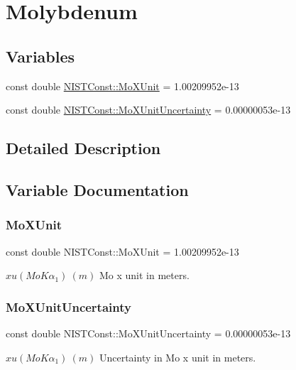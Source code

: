 \hypertarget{group___n_i_s_t_const-_molybdenum}{}\section{Molybdenum}
\label{group___n_i_s_t_const-_molybdenum}
\subsection*{Variables}
\begin{DoxyCompactItemize}
\item 
const double \hyperlink{group___n_i_s_t_const-_molybdenum_ga31f18ed601e6b0e9ebe95a3ac3d962f5}{N\+I\+S\+T\+Const\+::\+Mo\+X\+Unit} = 1.\+00209952e-\/13
\item 
const double \hyperlink{group___n_i_s_t_const-_molybdenum_ga19a2cda46a2fb26d7036c47c53cdd607}{N\+I\+S\+T\+Const\+::\+Mo\+X\+Unit\+Uncertainty} = 0.\+00000053e-\/13
\end{DoxyCompactItemize}


\subsection{Detailed Description}


\subsection{Variable Documentation}
\mbox{\label{group___n_i_s_t_const-_molybdenum_ga31f18ed601e6b0e9ebe95a3ac3d962f5}} 
\subsubsection{\texorpdfstring{Mo\+X\+Unit}{MoXUnit}}
{\footnotesize\ttfamily const double N\+I\+S\+T\+Const\+::\+Mo\+X\+Unit = 1.\+00209952e-\/13}

$xu(MoK\alpha_1) \ (m)$ Mo x unit in meters. \mbox{\label{group___n_i_s_t_const-_molybdenum_ga19a2cda46a2fb26d7036c47c53cdd607}} 
\subsubsection{\texorpdfstring{Mo\+X\+Unit\+Uncertainty}{MoXUnitUncertainty}}
{\footnotesize\ttfamily const double N\+I\+S\+T\+Const\+::\+Mo\+X\+Unit\+Uncertainty = 0.\+00000053e-\/13}

$xu(MoK\alpha_1) \ (m)$ Uncertainty in Mo x unit in meters. 